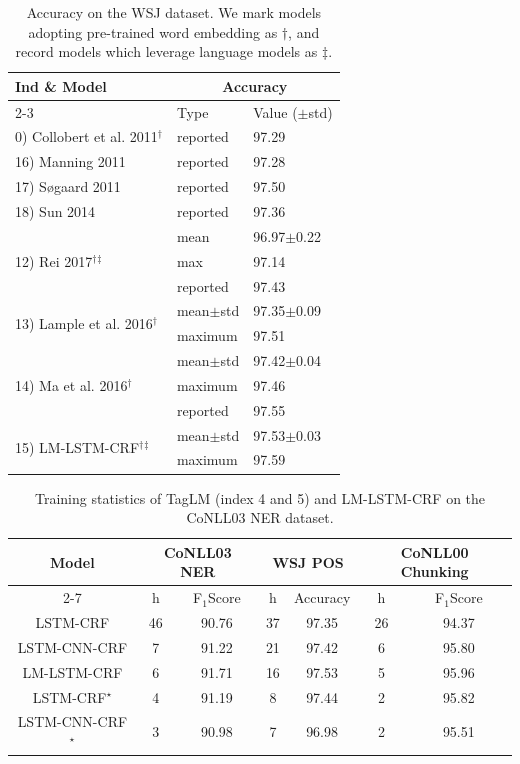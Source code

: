\documentclass[letterpaper]{article} %
\newcommand{\our}{\textsc{LM-LSTM-CRF}\xspace}
\newcommand{\sbef}{}
\begin{document}
\begin{table}
\center
\scalebox{0.9}
{
\begin{tabular}{l||l|l}
\hline
\multirow{2}{*}{Ind \& Model} & \multicolumn{2}{|c}{Accuracy}\\
\cline{2-3}
& Type & Value ($\pm$std)\\
\hline
\hline
0) Collobert et al. 2011$^\dagger$ & reported& 97.29\\
\hline
16) Manning 2011 & reported & 97.28 \\
\hline
17) \nocite{sogaard2011semisupervised} S{\o}gaard 2011& reported& 97.50\\
\hline
18) \nocite{sun2014structure} Sun 2014 & reported& 97.36 \\
\hline
\multirow{3}{*}{12) Rei 2017$^\dagger$$^\ddagger$} & mean & 96.97$\pm$0.22\\
\cline{2-3}
& max & 97.14\\
\cline{2-3}
& reported & 97.43\\
\hline
\multirow{2}{*}{13) Lample et al. 2016$^\dagger$} & mean$\pm$std & 97.35$\pm$0.09\\
\cline{2-3}
& maximum & 97.51\\
\hline
\multirow{3}{*}{14) Ma et al. 2016$^\dagger$} &mean$\pm$std & 97.42$\pm$0.04\\
\cline{2-3}
& maximum & 97.46\\
\cline{2-3}
& reported & 97.55\\
\hline
\multirow{2}{*}{15) \our$^\dagger$$^\ddagger$} & mean$\pm$std & 97.53$\pm$0.03\\
\cline{2-3}
& maximum & 97.59\\
\hline
\end{tabular}
}
\caption{Accuracy on the WSJ dataset.
We mark models adopting pre-trained word embedding as $\dagger$, and record models which leverage language models as $\ddagger$.
}\label{tbl:pos}
\end{table}


\begin{table}
\center
\scalebox{0.65}
{
\begin{tabular}{c||c|c||c|c||c|c}
\hline
\multirow{2}{*}{Model} & \multicolumn{2}{|c||}{CoNLL03 NER} & \multicolumn{2}{|c||}{WSJ POS} & \multicolumn{2}{|c}{CoNLL00 Chunking} \\
\cline{2-7}
& h & F$_1$Score & h & Accuracy & h & F$_1$Score\\
\hline
\hline
LSTM-CRF & 46 & 90.76 & 37 & 97.35 & 26 & 94.37 \\
\hline
LSTM-CNN-CRF & 7 & 91.22 & 21 & 97.42 & 6 & 95.80 \\
\hline
\our & 6 & 91.71 & 16 & 97.53 & 5 & 95.96 \\
\hline
LSTM-CRF$^\star$ & 4 & 91.19 & 8 & 97.44 & 2 & 95.82 \\
\hline
LSTM-CNN-CRF$^\star$ & 3 & 90.98 & 7 & 96.98 & 2 & 95.51 \\
\end{tabular}
}
\caption{Training statistics of TagLM (index 4 and 5) and \our on the CoNLL03 NER dataset.}\label{tbl:eff2}
\end{table}
\end{document}
